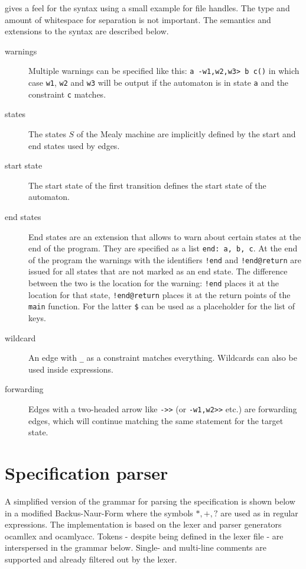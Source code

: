  gives a feel for the syntax using a small example for file handles. The type and amount of whitespace for separation is not important.
The semantics and extensions to the syntax are described below.
\begin{description}
\item[warnings]
Multiple warnings can be specified like this: \verb|a -w1,w2,w3> b c()|  in which case \verb|w1|, \verb|w2| and \verb|w3| will be output if the automaton is in state \verb|a| and the constraint \verb|c| matches.

\item[states]
The states $S$ of the Mealy machine are implicitly defined by the start and end states used by edges.

\item[start state]
The start state of the first transition defines the start state of the automaton.

\item[end states]
End states are an extension that allows to warn about certain states at the end of the program. They are specified as a list \verb|end: a, b, c|.
At the end of the program the warnings with the identifiers \verb|!end| and \verb|!end@return| are issued for all states that are not marked as an end state. The difference between the two is the location for the warning: \verb|!end| places it at the location for that state, \verb|!end@return| places it at the return points of the \verb|main| function. For the latter \verb|$| can be used as a placeholder for the list of keys.

\item[wildcard]
An edge with \verb|_| as a constraint matches everything. Wildcards can also be used inside expressions.

\item[forwarding]
Edges with a two-headed arrow like \verb|->>| (or \verb|-w1,w2>>| etc.) are forwarding edges, which will continue matching the same statement for the target state.
\end{description}

\section{Specification parser}
A simplified version of the grammar for parsing the specification is shown below in a modified Backus-Naur-Form where the symbols $*, +, ?$ are used as in regular expressions. The implementation is based on the lexer and parser generators ocamllex and ocamlyacc. Tokens - despite being defined in the lexer file - are interspersed in the grammar below. Single- and multi-line comments are supported and already filtered out by the lexer.

